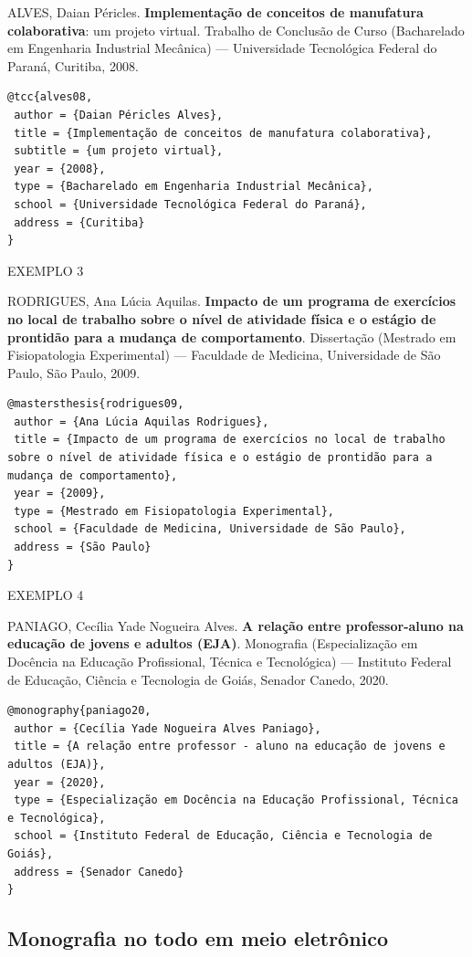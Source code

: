 ALVES, Daian Péricles. \textbf{Implementação de conceitos de manufatura colaborativa}: um projeto virtual. Trabalho de Conclusão de Curso (Bacharelado em Engenharia Industrial Mecânica) — Universidade Tecnológica Federal do Paraná, Curitiba, 2008.

\begin{verbatim}
@tcc{alves08,
 author = {Daian Péricles Alves},
 title = {Implementação de conceitos de manufatura colaborativa},
 subtitle = {um projeto virtual},
 year = {2008},
 type = {Bacharelado em Engenharia Industrial Mecânica},
 school = {Universidade Tecnológica Federal do Paraná},
 address = {Curitiba}
}
\end{verbatim}

EXEMPLO 3 

RODRIGUES, Ana Lúcia Aquilas. \textbf{Impacto de um programa de exercícios no local de trabalho sobre o nível de atividade física e o estágio de prontidão para a mudança de comportamento}. Dissertação (Mestrado em Fisiopatologia Experimental) — Faculdade de Medicina, Universidade de São Paulo, São Paulo, 2009.

\begin{verbatim}
@mastersthesis{rodrigues09,
 author = {Ana Lúcia Aquilas Rodrigues},
 title = {Impacto de um programa de exercícios no local de trabalho sobre o nível de atividade física e o estágio de prontidão para a mudança de comportamento},
 year = {2009},
 type = {Mestrado em Fisiopatologia Experimental},
 school = {Faculdade de Medicina, Universidade de São Paulo},
 address = {São Paulo}
}
\end{verbatim}

EXEMPLO 4 

PANIAGO, Cecília Yade Nogueira Alves. \textbf{A relação entre professor-aluno na educação de jovens e adultos (EJA)}. Monografia (Especialização em Docência na Educação Profissional, Técnica e Tecnológica) — Instituto Federal de Educação, Ciência e Tecnologia de Goiás, Senador Canedo, 2020.

\begin{verbatim}
@monography{paniago20,
 author = {Cecília Yade Nogueira Alves Paniago},
 title = {A relação entre professor - aluno na educação de jovens e adultos (EJA)},
 year = {2020},
 type = {Especialização em Docência na Educação Profissional, Técnica e Tecnológica},
 school = {Instituto Federal de Educação, Ciência e Tecnologia de Goiás},
 address = {Senador Canedo}
}
\end{verbatim}

\subsection{Monografia no todo em meio eletrônico}

